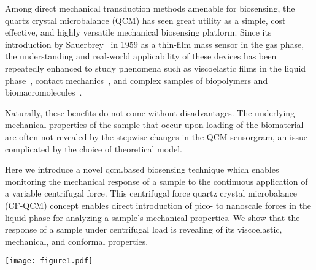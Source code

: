 \documentclass[floatfix,superscriptaddress,a4paper,twocolumn]{revtex4-1}
\let\oldsqrt\sqrt
\def\sqrt{\mathpalette\DHLhksqrt}
\def\DHLhksqrt#1#2{%
\setbox0=\hbox{$#1\oldsqrt{#2\,}$}\dimen0=\ht0
\advance\dimen0-0.2\ht0
\setbox2=\hbox{\vrule height\ht0 depth -\dimen0}%
{\box0\lower0.4pt\box2}}
\begin{document}
Among direct mechanical transduction methods amenable for biosensing, the
quartz crystal microbalance (QCM) has seen great utility as a simple, cost
effective, and highly versatile mechanical biosensing platform.  Since its
introduction by Sauerbrey~\cite{sauerbrey1959verwendung} in 1959 as a
thin-film mass sensor in the gas phase, the understanding and real-world
applicability of these devices has been repeatedly enhanced
to study phenomena such as viscoelastic films in the liquid
phase~\cite{kanazawa1985frequency}, contact
mechanics~\cite{johannsman2007contacts}, and complex samples of biopolymers
and biomacromolecules~\cite{marx2003quartz}.

Naturally, these benefits do not come without disadvantages. The
underlying mechanical properties of the sample that occur upon loading of
the biomaterial are often not revealed by the stepwise changes in the QCM
sensorgram, an issue complicated by the choice of theoretical model.

Here we introduce a novel \gls{qcm}.based biosensing technique which enables
monitoring the mechanical response of a sample to the continuous
application of a variable centrifugal force.  This centrifugal force quartz
crystal microbalance (CF-QCM) concept enables direct introduction of pico-
to nanoscale forces in the liquid phase for analyzing a sample's mechanical
properties.  We show that the response of a sample under
centrifugal load is revealing of its viscoelastic, mechanical, and conformal
properties.
\begin{figure*}[ht]
  \centering
  \texttt{[image: figure1.pdf]}
  \caption{Overview of the CF-QCM\@.  (a) Experimental setup.  A \gls{qcm} and its driver are integrated into one
    arm of a standard swinging bucket centrifuge.  Data acquisition is done
    electrically through a tether and a centrally mounted slip ring.  When
    spinning, centrifugal force is applied to a sample under assay. Here
    $F_\mathrm{c} \equiv m \sqrt{a_\mathrm{c}^2 +a_\mathrm{g}^2}$, where
    $a_\mathrm{c}=\omega^2 R$ and $a_\mathrm{g}$ are centripetal and gravitational
    accelerations, respectively.  (b)
    Example CF-QCM experiment with \SI{1}{\micro\meter} particles in water,
    $N_\mathrm{L}=\SI{1.58e11}{\particle\per\meter\squared}$, in the
    ``loading'' configuration (inset).  The horizontal arrows indicate the
    motion of the \gls{qcm}['s] transverse shear mode.
    The spin up to \SI{90}{g} in
    loading configuration enhances the \gls{qcm} frequency shift signal and allows
    extraction of mechanical properties of the sample, as well as particle
    size. See text for details.
  }
  \label{fig:expsetup}
\end{figure*}
\end{document}
